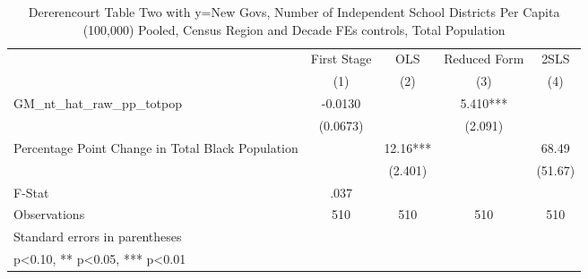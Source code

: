 \begin{table}[htbp]\centering
\def\sym#1{\ifmmode^{#1}\else\(^{#1}\)\fi}
\caption{Dererencourt Table Two with y=New Govs, Number of Independent School Districts Per Capita (100,000) Pooled, Census Region and Decade FEs controls, Total Population}
\begin{tabular}{l*{4}{c}}
\toprule
                    & First Stage   &         OLS   &Reduced Form   &        2SLS   \\
                    &\multicolumn{1}{c}{(1)}   &\multicolumn{1}{c}{(2)}   &\multicolumn{1}{c}{(3)}   &\multicolumn{1}{c}{(4)}   \\
\midrule
GM\_nt\_hat\_raw\_pp\_totpop&     -0.0130   &               &       5.410***&               \\
                    &    (0.0673)   &               &     (2.091)   &               \\
\addlinespace
Percentage Point Change in Total Black Population&               &       12.16***&               &       68.49   \\
                    &               &     (2.401)   &               &     (51.67)   \\
\midrule
F-Stat              &        .037   &               &               &               \\
Observations        &         510   &         510   &         510   &         510   \\
\bottomrule
\multicolumn{5}{l}{\footnotesize Standard errors in parentheses}\\
\multicolumn{5}{l}{\footnotesize * p<0.10, ** p<0.05, *** p<0.01}\\
\end{tabular}
\end{table}
